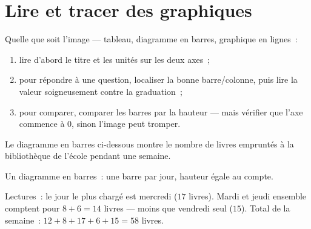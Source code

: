 \section{Lire et tracer des graphiques}

\begin{method}\label{met:g6:propdata:read}
Quelle que soit l'image --- tableau, diagramme en barres, graphique en
lignes~:
\begin{enumerate}
  \item lire d'abord le titre et les unités sur les deux axes~;
  \item pour répondre à une question, localiser la bonne barre/colonne,
        puis lire la valeur soigneusement contre la graduation~;
  \item pour comparer, comparer les barres par la hauteur --- mais
        vérifier que l'axe commence à $0$, sinon l'image peut
        tromper.
\end{enumerate}
\end{method}

\begin{example}\label{ex:g6:propdata:chart}
Le diagramme en barres ci-dessous montre le nombre de livres empruntés
à la bibliothèque de l'école pendant une semaine.

\begin{omfigure}

{\small Un diagramme en barres~: une barre par jour, hauteur égale au
compte.}
\end{omfigure}

Lectures~: le jour le plus chargé est mercredi ($17$ livres). Mardi et
jeudi ensemble comptent pour $8 + 6 = 14$ livres --- moins que
vendredi seul ($15$). Total de la semaine~:
$12 + 8 + 17 + 6 + 15 = 58$ livres.
\end{example}

